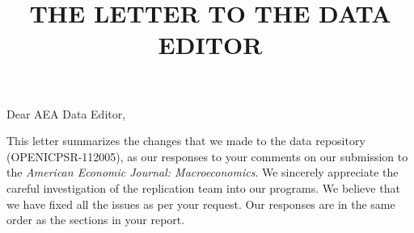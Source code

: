 \documentclass[twoside,12pt,leqno]{article}
\begin{document}
\title{\large{THE LETTER TO THE DATA EDITOR}}
\date{}
\maketitle

\vspace{-1.75cm}

\begin{flushleft}
Dear AEA Data Editor,
\end{flushleft}

This letter summarizes the changes that we made to the data repository (OPENICPSR-112005), as our responses to your comments on our submission to the \textit{American Economic Journal: Macroeconomics}. We sincerely appreciate the careful investigation of the replication team into our programs. We believe that we have fixed all the issues as per your request. Our responses are in the same order as the sections in your report.
\end{document}
